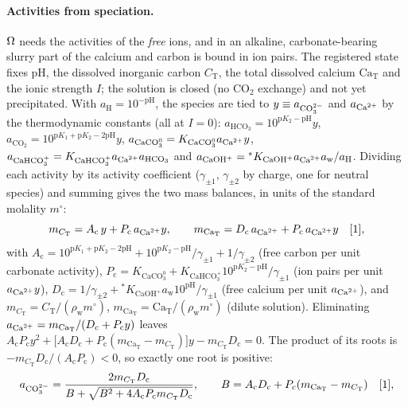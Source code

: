 \paragraph{Activities from speciation.} $\Omega$ needs the activities of the \emph{free} ions, and in
an alkaline, carbonate-bearing slurry part of the calcium and carbon is bound in ion pairs. The
registered state fixes pH, the dissolved inorganic carbon $C_\mathrm{T}$, the total dissolved
calcium $\mathrm{Ca}_\mathrm{T}$ and the ionic strength $I$; the solution is closed (no CO$_2$
exchange) and not yet precipitated. With $a_\mathrm{H}=10^{-\mathrm{pH}}$, the species are tied to
$y\equiv a_{\mathrm{CO}_3^{2-}}$ and $a_{\mathrm{Ca}^{2+}}$ by the thermodynamic constants (all at $I=0$): $a_{\mathrm{HCO_3}}=10^{\mathrm{p}K_2-\mathrm{pH}}y$,
$a_{\mathrm{CO_2}}=10^{\mathrm{p}K_1+\mathrm{p}K_2-2\mathrm{pH}}y$, $a_{\mathrm{CaCO_3^0}}=K_{\mathrm{CaCO_3^0}}a_{\mathrm{Ca}^{2+}} y$,
$a_{\mathrm{CaHCO_3^+}}=K_{\mathrm{CaHCO_3^+}}a_{\mathrm{Ca}^{2+}} a_{\mathrm{HCO_3}}$ and
$a_{\mathrm{CaOH^+}}={}^{*}K_{\mathrm{CaOH^+}}a_{\mathrm{Ca}^{2+}} a_\mathrm{w}/a_\mathrm{H}$. Dividing each activity by its
activity coefficient ($\gamma_{\pm1}$, $\gamma_{\pm2}$ by charge, one for neutral species) and
summing gives the two mass balances, in units of the standard molality $m^{\circ}$:
\begin{equation}\label{th:eq:balance}
m_{C_\mathrm{T}}=A_\mathrm{c}\,y+P_\mathrm{c}\,a_{\mathrm{Ca}^{2+}} y,\qquad
m_{\mathrm{Ca}_\mathrm{T}}=D_\mathrm{c}\,a_{\mathrm{Ca}^{2+}}+P_\mathrm{c}\,a_{\mathrm{Ca}^{2+}} y \quad[\mathrm{1}],
\end{equation}
with $A_\mathrm{c}=10^{\mathrm{p}K_1+\mathrm{p}K_2-2\mathrm{pH}}+10^{\mathrm{p}K_2-\mathrm{pH}}/\gamma_{\pm1}+1/\gamma_{\pm2}$
(free carbon per unit carbonate activity), $P_\mathrm{c}=K_{\mathrm{CaCO_3^0}}+K_{\mathrm{CaHCO_3^+}}10^{\mathrm{p}K_2-\mathrm{pH}}/\gamma_{\pm1}$
(ion pairs per unit $a_{\mathrm{Ca}^{2+}} y$), $D_\mathrm{c}=1/\gamma_{\pm2}+{}^{*}K_{\mathrm{CaOH^+}}a_\mathrm{w}10^{\mathrm{pH}}/\gamma_{\pm1}$
(free calcium per unit $a_{\mathrm{Ca}^{2+}}$), and $m_{C_\mathrm{T}}=C_\mathrm{T}/(\rho_\mathrm{w}m^{\circ})$,
$m_{\mathrm{Ca}_\mathrm{T}}=\mathrm{Ca}_\mathrm{T}/(\rho_\mathrm{w}m^{\circ})$ (dilute solution). Eliminating
$a_{\mathrm{Ca}^{2+}}=m_{\mathrm{Ca}_\mathrm{T}}/(D_\mathrm{c}+P_\mathrm{c}y)$ leaves
$A_\mathrm{c}P_\mathrm{c}y^{2}+\big[A_\mathrm{c}D_\mathrm{c}+P_\mathrm{c}(m_{\mathrm{Ca}_\mathrm{T}}-m_{C_\mathrm{T}})\big]y-m_{C_\mathrm{T}}D_\mathrm{c}=0$.
The product of its roots is $-m_{C_\mathrm{T}}D_\mathrm{c}/(A_\mathrm{c}P_\mathrm{c})<0$, so exactly one
root is positive:
\begin{equation}\label{th:eq:aco3}
a_{\mathrm{CO}_3^{2-}}=\frac{2m_{C_\mathrm{T}}D_\mathrm{c}}{B+\sqrt{B^{2}+4A_\mathrm{c}P_\mathrm{c}m_{C_\mathrm{T}}D_\mathrm{c}}},\qquad
B=A_\mathrm{c}D_\mathrm{c}+P_\mathrm{c}(m_{\mathrm{Ca}_\mathrm{T}}-m_{C_\mathrm{T}}) \quad[\mathrm{1}],
\end{equation}
